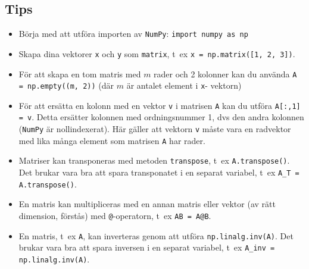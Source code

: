 \documentclass[titlepage, 10pt]{article}
\begin{document}
\subsection{Tips}
\begin{itemize}
  \item Börja med att utföra importen av \texttt{NumPy}: \texttt{import numpy as
  np}
  \item Skapa dina vektorer \texttt{x} och \texttt{y} som \texttt{matrix},
  \mbox{t ex} \texttt{x = np.matrix([1, 2, 3])}.
  \item För att skapa en tom matris med $m$ rader och 2 kolonner kan du använda
  \texttt{A = np.empty((m, 2))} (där $m$ är antalet element i \texttt{x}-
  vektorn)
  \item För att ersätta en kolonn med en vektor \texttt{v} i matrisen \texttt{A}
  kan du utföra \texttt{A[:,1] = v}. Detta ersätter kolonnen med ordningsnummer
  1, dvs den andra kolonnen (\texttt{NumPy} är nollindexerat). Här gäller att
  vektorn \texttt{v} måste vara en radvektor med lika många element som matrisen
  \texttt{A} har rader.
  \item Matriser kan transponeras med metoden \texttt{transpose}, \mbox{t ex}
  \texttt {A.transpose()}. Det brukar vara bra att spara transponatet
  i en separat variabel, \mbox{t ex} \texttt{A\_T = A.transpose()}.
  \item En matris kan multipliceras med en annan matris eller vektor (av rätt
  dimension, förstås) med \texttt{@}-operatorn, \mbox{t ex} \texttt{AB = A@B}.
  \item En matris, \mbox{t ex} \texttt{A}, kan inverteras genom att utföra
  \texttt{np.linalg.inv(A)}. Det brukar vara bra att spara inversen i en separat
  variabel, \mbox{t ex} \texttt{A\_inv = np.linalg.inv(A)}.

\end{itemize}

\newpage
 

\end{document}
